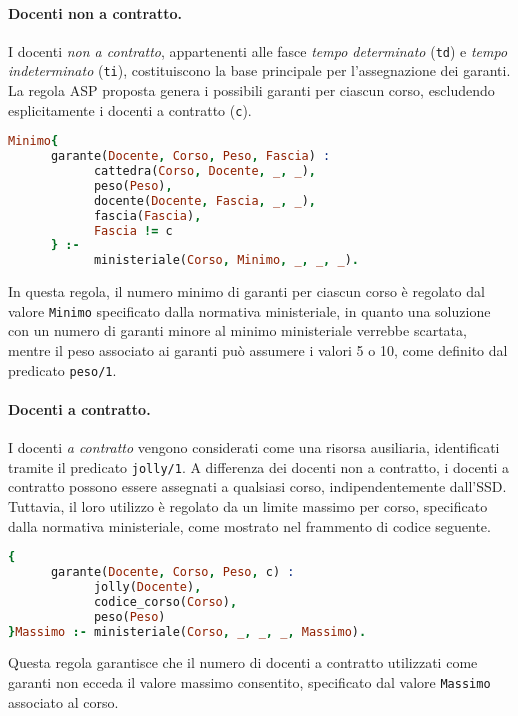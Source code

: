 \paragraph{Docenti non a contratto.}
I docenti \textit{non a contratto}, appartenenti alle fasce \textit{tempo determinato} 
(\texttt{td}) e \textit{tempo indeterminato} (\texttt{ti}), costituiscono la base principale 
per l'assegnazione dei garanti. La regola ASP proposta genera i possibili garanti per ciascun corso, 
escludendo esplicitamente i docenti a contratto (\texttt{c}).

\begin{lstlisting}[language=prolog, caption=Generazione dei garanti non a contratto.]
Minimo{
      garante(Docente, Corso, Peso, Fascia) :
            cattedra(Corso, Docente, _, _),
            peso(Peso),
            docente(Docente, Fascia, _, _),
            fascia(Fascia),
            Fascia != c
      } :-
            ministeriale(Corso, Minimo, _, _, _).
\end{lstlisting}

In questa regola, il numero minimo di garanti per ciascun corso è regolato dal valore \texttt{Minimo} 
specificato dalla normativa ministeriale, in quanto una soluzione con un numero di garanti minore al 
minimo ministeriale verrebbe scartata, mentre il peso associato ai garanti può assumere i valori 5 o 
10, come definito dal predicato \texttt{peso/1}.

\paragraph{Docenti a contratto.}
I docenti \textit{a contratto} vengono considerati come una risorsa ausiliaria, identificati tramite 
il predicato \texttt{jolly/1}. A differenza dei docenti non a contratto, i docenti a contratto possono 
essere assegnati a qualsiasi corso, indipendentemente dall'SSD. Tuttavia, il loro utilizzo è regolato 
da un limite massimo per corso, specificato dalla normativa ministeriale, come mostrato nel frammento
di codice seguente.

\begin{lstlisting}[language=prolog, caption=Generazione dei garanti a contratto.]
{     
      garante(Docente, Corso, Peso, c) :
            jolly(Docente),
            codice_corso(Corso),
            peso(Peso)
}Massimo :- ministeriale(Corso, _, _, _, Massimo).
\end{lstlisting}

Questa regola garantisce che il numero di docenti a contratto utilizzati come garanti non ecceda il 
valore massimo consentito, specificato dal valore \texttt{Massimo} associato al corso.


